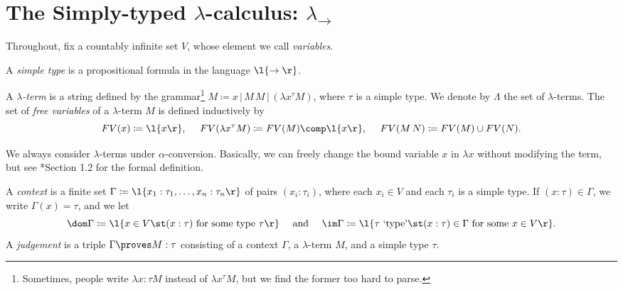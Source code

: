 \documentclass[reqno]{amsart}
\begin{document}
    \section{The Simply-typed $\lambda$-calculus: $\lambda_\rightarrow$}

    Throughout, fix a countably infinite set $V$, whose element we call \textit{variables}.

    \begin{definition}
        A \textit{simple type} is a propositional formula in the language $\l\{\rightarrow\r\}$.
    \end{definition}

    \begin{definition}
        A \textit{$\lambda$-term} is a string defined by the grammar\footnote{Sometimes, people write $\lambda x:\tau M$ instead of $\lambda x^\tau M$, but we find the former too hard to parse.} $M\coloneqq x\,|\,M\,M\,|\,(\lambda x^\tau M)$, where $\tau$ is a simple type. We denote by $\Lambda$ the set of $\lambda$-terms. The set of \textit{free variables} of a $\lambda$-term $M$ is defined inductively by
        \begin{equation*}
            FV(x)\coloneqq\l\{x\r\},\ \ \ \ FV(\lambda x^\tau M)\coloneqq FV(M)\comp\l\{x\r\},\ \ \ \ FV(M\,N)\coloneqq FV(M)\cup FV(N).
        \end{equation*}
    \end{definition}

    \begin{remark}
        We always consider $\lambda$-terms under $\alpha$-conversion. Basically, we can freely change the bound variable $x$ in $\lambda x$ without modifying the term, but see \cite{SU06}*{Section 1.2} for the formal definition.
    \end{remark}

    \begin{definition}
        A \textit{context} is a finite set $\Gamma\coloneqq\l\{x_1:\tau_1,\dots,x_n:\tau_n\r\}$ of pairs $(x_i:\tau_i)$, where each $x_i\in V$ and each $\tau_i$ is a simple type. If $(x:\tau)\in\Gamma$, we write $\Gamma(x)=\tau$, and we let
        \begin{equation*}
            \dom\Gamma\coloneqq\l\{x\in V\st(x:\tau)\textrm{ for some type }\tau\r\}\ \ \ \ \textrm{and}\ \ \ \ \im\Gamma\coloneqq\l\{\tau\textrm{ `type'}\st(x:\tau)\in\Gamma\textrm{ for some }x\in V\r\}.
        \end{equation*}
        A \textit{judgement} is a triple $\Gamma\proves M:\tau$ consisting of a context $\Gamma$, a $\lambda$-term $M$, and a simple type $\tau$.
    \end{definition}
\end{document}
